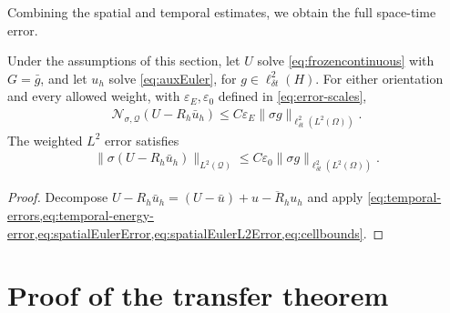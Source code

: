 \documentclass[print,wide,eng]{draft}
\begin{document}
Combining the spatial and temporal estimates, we obtain the full space-time error.
%
\begin{theorem}\label{thm:combined}
Under the assumptions of this section, let $U$ solve \cref{eq:frozencontinuous} with $G=\bar g$, and let $u_h$ solve \cref{eq:auxEuler}, for $g\in\ell_{\delta t}^2(H)$. For either orientation and every allowed weight, with $\varepsilon_E,\varepsilon_0$ defined in \cref{eq:error-scales},
%
\begin{align}\label{eq:combinederror}
\mathcal N_{\sigma,\mathcal Q}(U-R_h\bar u_h)
\leq C\varepsilon_E\|\sigma g\|_{\ell_{\delta t}^2(L^2(\Omega))}.
\end{align}
%
The weighted $L^2$ error satisfies
%
\begin{align}\label{eq:combined-l2-error}
\|\sigma(U-R_h\bar u_h)\|_{L^2(\mathcal Q)}
\leq C\varepsilon_0\|\sigma g\|_{\ell_{\delta t}^2(L^2(\Omega))}.
\end{align}
%
\end{theorem}
%
\begin{proof}
Decompose $U-R_h\bar u_h=(U-\bar u)+\overline{u-R_hu_h}$ and apply \cref{eq:temporal-errors,eq:temporal-energy-error,eq:spatialEulerError,eq:spatialEulerL2Error,eq:cellbounds}.
\end{proof}
%

\section{Proof of the transfer theorem}\label{sec:transfer}
\end{document}

